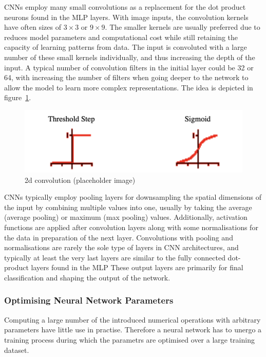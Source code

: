 CNNs employ many small convolutions as a replacement for the dot product neurons found in the MLP layers.
With image inputs, the convolution kernels have often sizes of $3 \times 3$ or $9 \times 9$.
The smaller kernels are usually preferred  due to reduces model parameters and computational cost while still retaining the capacity of learning patterns from data.
The input is convoluted with a large number of these small kernels individually, and thus increasing the depth of the input.
A typical number of convolution filters in the initial layer could be 32 or 64, with increasing the number of filters when going deeper to the network to allow the model to learn more complex representations.
The idea is depicted in figure~\ref{fig:2dconv}.
\begin{figure}\label{fig:2dconv}
    \includegraphics{background/fig/activations.png}
    \caption{2d convolution (placeholder image)}
\end{figure}

CNNs typically employ pooling layers for downsampling the spatial dimensions of the input by combining multiple values into one, usually by taking the average (average pooling) or maximum (max pooling) values.
Additionally, activation functions are applied after convolution layers along with some normalisations for the data in preparation of the next layer.
Convolutions with pooling and normalisations are rarely the sole type of layers in CNN architectures, and typically at least the very last layers are similar to the fully connected dot-product layers found in the MLP\@
These output layers are primarily for final classification and shaping the output of the network.

\subsubsection{Optimising Neural Network Parameters}
Computing a large number of the introduced numerical operations with arbitrary parameters have little use in practise.
Therefore a neural network has to unergo a training process during which the parametrs are optimised over a large training dataset.

